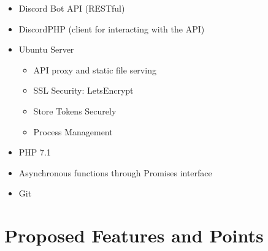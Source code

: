 \documentclass[11pt]{article}
\begin{document}
        \begin{itemize}

            \item Discord Bot API (RESTful)
            \item DiscordPHP (client for interacting with the API)
            \item Ubuntu Server
                \begin{itemize}
                    \item API proxy and static file serving
                    \item SSL Security: LetsEncrypt
                    \item Store Tokens Securely
                    \item Process Management
                \end{itemize}
            \item PHP 7.1
            \item Asynchronous functions through Promises interface
            \item Git

        \end{itemize}




    \section{Proposed Features and Points}
\end{document}
